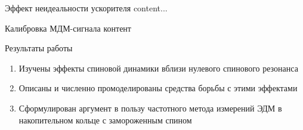 \documentclass[14pt]{beamer}
\begin{document}
\begin{frame}{Эффект неидеальности ускорителя}
	content...
\end{frame}

\begin{frame}{Калибровка МДМ-сигнала}
контент
\end{frame}

\begin{frame}{Результаты работы}
	\begin{enumerate}
		\item Изучены эффекты спиновой динамики вблизи нулевого спинового резонанса
		\item Описаны и численно промоделированы средства борьбы с этими эффектами
		\item Сформулирован аргумент в пользу частотного метода измерений ЭДМ в накопительном кольце с замороженным спином
	\end{enumerate}
\end{frame}

\end{document}
